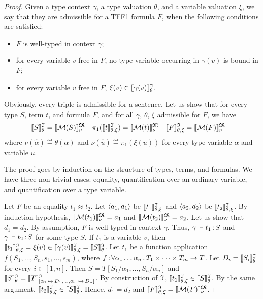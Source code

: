 \begin{proof}
Given a type context $\gamma$, a type valuation $\theta$,
and a variable valuation $\xi$, we say that they are admissible
for a TFF1 formula $F$, when the following conditions are satisfied:
\begin{itemize}
\item $F$ is well-typed in context $\gamma$;
\item for every variable $v$ free in $F$, no type variable
occurring in $\gamma(v)$ is bound in $F$;
\item for every variable $v$ free in $F$, $\xi(v) \in \llbracket\gamma(v)\rrbracket^{\mathfrak{I}}_{\theta}$.
\end{itemize}
Obviously, every triple is admissible for a sentence.
Let us show that for every type $S$, term $t$, and formula $F$,
and for all $\gamma$, $\theta$, $\xi$ admissible for $F$, we have
\begin{align*}
\llbracket S\rrbracket^{\mathfrak{I}}_{\theta} &= \llbracket \mathcal{M}(S) \rrbracket^{\mathfrak{M}}_{\nu} &
\pi_1(\llbracket t\rrbracket^{\mathfrak{I}}_{\theta,\xi}) &= \llbracket \mathcal{M}(t) \rrbracket^{\mathfrak{M}}_{\nu} &
\llbracket F\rrbracket^{\mathfrak{I}}_{\theta,\xi} &= \llbracket \mathcal{M}(F) \rrbracket^{\mathfrak{M}}_{\nu}
\end{align*}
where $\nu(\hat{\alpha}) \eqdef \theta(\alpha)$ and
$\nu(\hat{u}) \eqdef \pi_1(\xi(u))$
for every type variable $\alpha$ and variable $u$.

The proof goes by induction on the structure of types, terms, and formulas.
We have three non-trivial cases: equality, quantification over an ordinary
variable, and quantification over a type variable.

Let $F$ be an equality $t_1 \approx t_2$.
Let $\langle a_1, d_1 \rangle$ be $\llbracket t_1\rrbracket^{\mathfrak{I}}_{\theta,\xi}$ and $\langle a_2, d_2 \rangle$ be $\llbracket t_2\rrbracket^{\mathfrak{I}}_{\theta,\xi}$.
By induction hypothesis, $\llbracket \mathcal{M}(t_1) \rrbracket^{\mathfrak{M}}_{\nu} = a_1$ and
$\llbracket \mathcal{M}(t_2) \rrbracket^{\mathfrak{M}}_{\nu} = a_2$. Let us show that $d_1 = d_2$.
By assumption, $F$ is well-typed in context $\gamma$.
Thus, $\gamma\,\vdash t_1 \operatorname{:} S$ and $\gamma\,\vdash t_2 \operatorname{:} S$
for some type $S$.
If $t_1$ is a variable $v$, then
$\llbracket t_1\rrbracket^{\mathfrak{I}}_{\theta,\xi} = \xi(v) \in \llbracket\gamma(v)\rrbracket^{\mathfrak{I}}_{\theta,\xi} = \llbracket S\rrbracket^{\mathfrak{I}}_{\theta}$.
Let $t_1$ be a function application $f(S_1,\dots,S_n,s_1,\dots,s_m)$,
where $f \operatorname{:}
\forall \alpha_1\dots\alpha_n \,.\, T_1 \times \dots \times T_m \to T$.
Let $D_i = \llbracket S_i\rrbracket^{\mathfrak{I}}_{\theta}$ for every $i \in [1,n]$.
Then $S = T[S_1/\alpha_1,\dots,S_n/\alpha_n]$ and
$\llbracket S\rrbracket^{\mathfrak{I}}_{\theta} = \llbracket T \rrbracket^{\mathfrak{I}}_{[\alpha_1 \,\mapsto\, D_1,\dots,
\alpha_n \,\mapsto\, D_n]}$.
By construction of $\mathfrak{I}$, $\llbracket t_1\rrbracket^{\mathfrak{I}}_{\theta,\xi} \in \llbracket S\rrbracket^{\mathfrak{I}}_{\theta}$.
By the same argument, $\llbracket t_2\rrbracket^{\mathfrak{I}}_{\theta,\xi} \in \llbracket S\rrbracket^{\mathfrak{I}}_{\theta}$.
Hence, $d_1 = d_2$ and $\llbracket F\rrbracket^{\mathfrak{I}}_{\theta,\xi} = \llbracket \mathcal{M}(F) \rrbracket^{\mathfrak{M}}_{\nu}$.


\end{proof}
